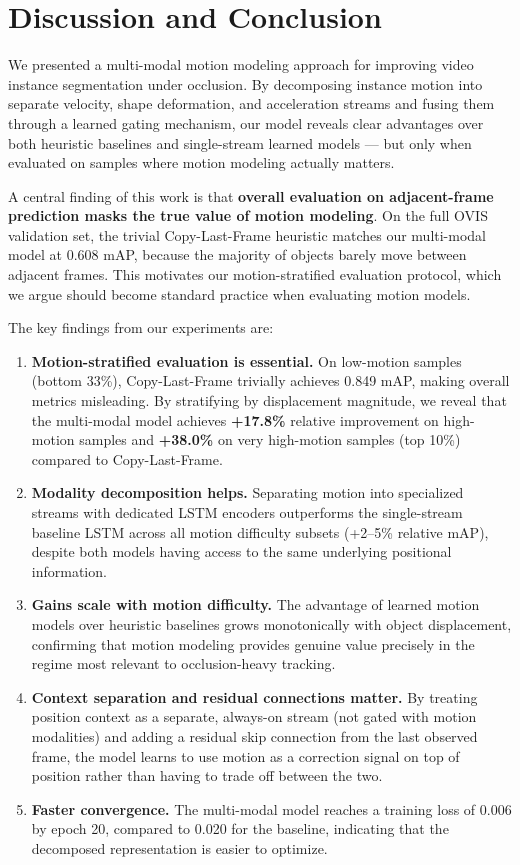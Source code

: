 \documentclass{article}
\begin{document}
\section{Discussion and Conclusion}

We presented a multi-modal motion modeling approach for improving video instance segmentation under occlusion. By decomposing instance motion into separate velocity, shape deformation, and acceleration streams and fusing them through a learned gating mechanism, our model reveals clear advantages over both heuristic baselines and single-stream learned models --- but only when evaluated on samples where motion modeling actually matters.

A central finding of this work is that \textbf{overall evaluation on adjacent-frame prediction masks the true value of motion modeling}. On the full OVIS validation set, the trivial Copy-Last-Frame heuristic matches our multi-modal model at 0.608 mAP, because the majority of objects barely move between adjacent frames. This motivates our motion-stratified evaluation protocol, which we argue should become standard practice when evaluating motion models.

The key findings from our experiments are:

\begin{enumerate}
\item \textbf{Motion-stratified evaluation is essential.} On low-motion samples (bottom 33\%), Copy-Last-Frame trivially achieves 0.849 mAP, making overall metrics misleading. By stratifying by displacement magnitude, we reveal that the multi-modal model achieves \textbf{+17.8\%} relative improvement on high-motion samples and \textbf{+38.0\%} on very high-motion samples (top 10\%) compared to Copy-Last-Frame.

\item \textbf{Modality decomposition helps.} Separating motion into specialized streams with dedicated LSTM encoders outperforms the single-stream baseline LSTM across all motion difficulty subsets (+2--5\% relative mAP), despite both models having access to the same underlying positional information.

\item \textbf{Gains scale with motion difficulty.} The advantage of learned motion models over heuristic baselines grows monotonically with object displacement, confirming that motion modeling provides genuine value precisely in the regime most relevant to occlusion-heavy tracking.

\item \textbf{Context separation and residual connections matter.} By treating position context as a separate, always-on stream (not gated with motion modalities) and adding a residual skip connection from the last observed frame, the model learns to use motion as a correction signal on top of position rather than having to trade off between the two.

\item \textbf{Faster convergence.} The multi-modal model reaches a training loss of 0.006 by epoch 20, compared to 0.020 for the baseline, indicating that the decomposed representation is easier to optimize.
\end{enumerate}
\end{document}
